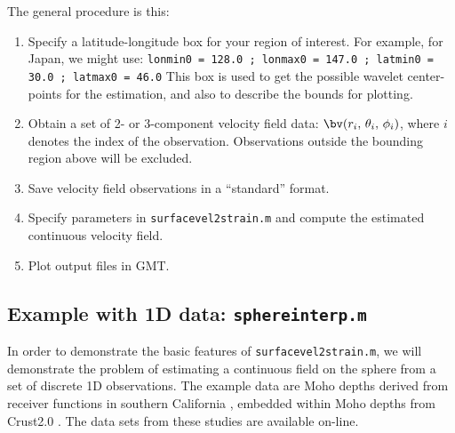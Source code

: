 \documentclass[11pt,titlepage,fleqn]{article}
\begin{document}
\bigskip\noindent
The general procedure is this:
%
\begin{enumerate}
\item Specify a latitude-longitude box for your region of interest. For example, for Japan, we might use:
%
\verb+lonmin0 = 128.0 ; lonmax0 = 147.0 ; latmin0 = 30.0 ; latmax0 = 46.0+
%
This box is used to get the possible wavelet center-points for the estimation, and also to describe the bounds for plotting.

\item Obtain a set of 2- or 3-component velocity field data: $\bv(r_i,\,\theta_i,\,\phi_i)$, where $i$ denotes the index of the observation. Observations outside the bounding region above will be excluded.

\item Save velocity field observations in a ``standard'' format.

\item Specify parameters in \verb+surfacevel2strain.m+ and compute the estimated continuous velocity field.

\item Plot output files in GMT.
\end{enumerate}


\subsection{Example with 1D data: {\tt sphereinterp.m}}
\label{sec:sphereinterp}

In order to demonstrate the basic features of \verb+surfacevel2strain.m+, we will demonstrate the problem of estimating a continuous field on the sphere from a set of discrete 1D observations. The example data are Moho depths derived from receiver functions in southern California \citep{YanClayton2007}, embedded within Moho depths from Crust2.0 \citep{Crust2}. The data sets from these studies are available on-line.
\end{document}
